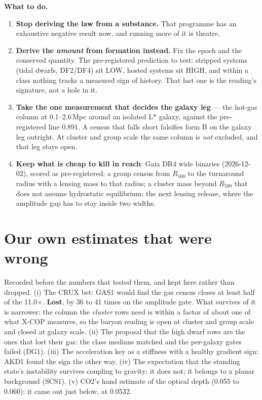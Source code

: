 \documentclass[10pt]{article}
\begin{document}
\textbf{What to do.}
\begin{enumerate}
\item \textbf{Stop deriving the law from a substance.} That programme has an exhaustive negative result now, and
  running more of it is theatre.
\item \textbf{Derive the {\it amount} from formation instead.} Fix the epoch and the conserved quantity. The
  pre-registered prediction to test: stripped systems (tidal dwarfs, DF2/DF4) sit LOW, hosted systems sit HIGH, and
  within a class nothing tracks a measured sign of history. That last one is the reading's signature, not a hole in it.
\item \textbf{Take the one measurement that decides the galaxy leg} --- the hot-gas column at 0.1--2.6\,Mpc around an
  isolated L* galaxy, against the pre-registered line 0.891. A census that falls short falsifies form B on the
  galaxy leg outright. At cluster and group scale the same column is {\it not} excluded, and that leg stays open.
\item \textbf{Keep what is cheap to kill in reach}: Gaia DR4 wide binaries (2026-12-02), scored as pre-registered;
  a group census from $R_{500}$ to the turnaround radius with a lensing mass to that radius; a cluster mass beyond
  $R_{500}$ that does not assume hydrostatic equilibrium; the next lensing release, where the amplitude gap has
  to stay inside two widths.
\end{enumerate}

\section{Our own estimates that were wrong}
Recorded before the numbers that tested them, and kept here rather than dropped.
(i) The CRUX bet: GAS1 would find the gas census closes at least half of the 11.0$\times$. {\bf Lost}, by 36 to 41
times on the amplitude gate. What survives of it is narrower: the column the {\it cluster} rows need is within a factor of
about one of what X-COP measures, so the baryon reading is open at cluster and group scale and closed at galaxy scale.
(ii) The proposal that the high dwarf rows are the ones that lost their gas: the class medians matched and the per-galaxy
gates failed (DG1).
(iii) The acceleration key as a stiffness with a healthy gradient sign: AKD1 found the sign the other way.
(iv) The expectation that the standing state's instability survives coupling to gravity: it does not; it belongs to a
planar background (SCS1).
(v) CO2's hand estimate of the optical depth (0.055 to 0.060): it came out just below, at 0.0532.
\end{document}
